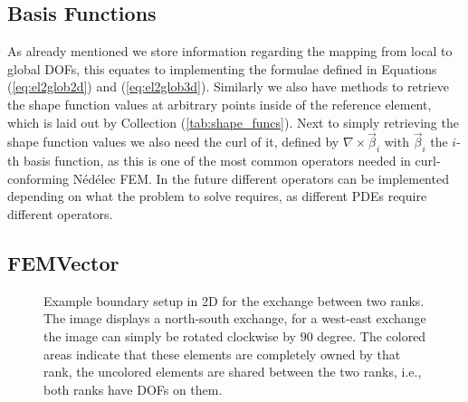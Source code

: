 \subsection{Basis Functions}
As already mentioned we store information regarding the mapping from local to global DOFs, this equates to implementing the formulae defined in Equations (\ref{eq:el2glob2d}) and (\ref{eq:el2glob3d}). Similarly we also have methods to retrieve the shape function values at arbitrary points inside of the reference element, which is laid out by Collection (\ref{tab:shape_funcs}). Next to simply retrieving the shape function values we also need the curl of it, defined by $\nabla \times \vec{\beta}_i$ with $\vec{\beta}_i$ the $i$-th basis function, as this is one of the most common operators needed in curl-conforming Nédélec FEM. In the future different operators can be implemented depending on what the problem to solve requires, as different PDEs require different operators.


\subsection{FEMVector}
\label{subsubsec:femvector}
\begin{figure}
    \centering
    
    \caption{Example boundary setup in 2D for the exchange between two ranks. The image displays a north-south exchange, for a west-east exchange the image can simply be rotated clockwise by \(90\) degree. The colored areas indicate that these elements are completely owned by that rank, the uncolored elements are shared between the two ranks, i.e., both ranks have DOFs on them.}
    \label{fig:halo2d}
\end{figure}

